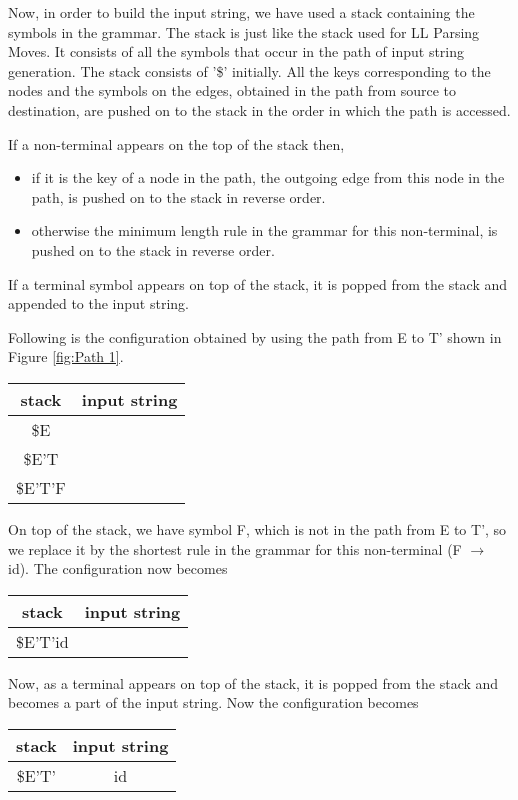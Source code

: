 \begin{example}
Now, in order to build the input string, we have used a stack containing the symbols in the grammar. The stack is just like the stack used for LL Parsing Moves. It consists of all the symbols that occur in the path of input string generation. The stack consists of '\$' initially. All the keys corresponding to the nodes and the symbols on the edges, obtained in the path from source to destination, are pushed on to the stack in the order in which the path is accessed.

If a non-terminal appears on the top of the stack then,
\begin{itemize}
\item if it is the key of a node in the path, the outgoing edge from this node in the path, is pushed on to the stack in reverse order.
\item otherwise the minimum length rule in the grammar for this non-terminal, is pushed on to the stack in reverse order.
\end{itemize}
If a terminal symbol appears on top of the stack, it is popped from the stack and appended to the input string.

Following is the configuration obtained by using the path from E to T' shown in Figure \ref{fig:Path 1}.
\begin{center}
\begin{tabular}{ |c|c| } 
 \hline
 \textbf{stack} & \textbf{input string} \\
 \hline
 \$E & \\
 \$E'T & \\
 \$E'T'F & \\
 \hline
\end{tabular}
\end{center}

On top of the stack, we have symbol F, which is not in the path from E to T', so we replace it by the shortest rule in the grammar for this non-terminal (F $\to$ id). The configuration now becomes
\begin{center}
\begin{tabular}{ |c|c| } 
 \hline
 \textbf{stack} & \textbf{input string} \\
 \hline
 \$E'T'id & \\
 \hline
\end{tabular}
\end{center}

Now, as a terminal appears on top of the stack, it is popped from the stack and becomes a part of the input string. Now the configuration becomes
\begin{center}
\begin{tabular}{ |c|c| } 
 \hline
 \textbf{stack} & \textbf{input string} \\
 \hline
 \$E'T' & id \\
 \hline
\end{tabular}
\end{center}


\end{example}
